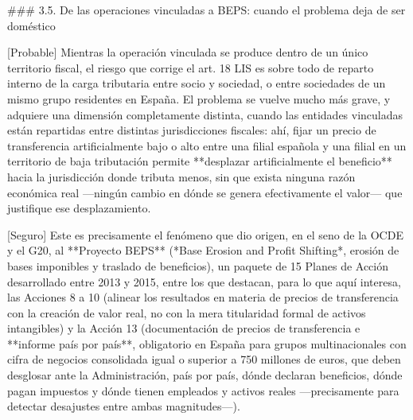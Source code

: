 \documentclass[10pt,a4paper]{article}
\begin{document}
### 3.5. De las operaciones vinculadas a BEPS: cuando el problema deja de ser doméstico

[Probable] Mientras la operación vinculada se produce dentro de un único territorio fiscal, el riesgo que corrige el art. 18 LIS es sobre todo de reparto interno de la carga tributaria entre socio y sociedad, o entre sociedades de un mismo grupo residentes en España. El problema se vuelve mucho más grave, y adquiere una dimensión completamente distinta, cuando las entidades vinculadas están repartidas entre distintas jurisdicciones fiscales: ahí, fijar un precio de transferencia artificialmente bajo o alto entre una filial española y una filial en un territorio de baja tributación permite **desplazar artificialmente el beneficio** hacia la jurisdicción donde tributa menos, sin que exista ninguna razón económica real —ningún cambio en dónde se genera efectivamente el valor— que justifique ese desplazamiento.

[Seguro] Este es precisamente el fenómeno que dio origen, en el seno de la OCDE y el G20, al **Proyecto BEPS** (*Base Erosion and Profit Shifting*, erosión de bases imponibles y traslado de beneficios), un paquete de 15 Planes de Acción desarrollado entre 2013 y 2015, entre los que destacan, para lo que aquí interesa, las Acciones 8 a 10 (alinear los resultados en materia de precios de transferencia con la creación de valor real, no con la mera titularidad formal de activos intangibles) y la Acción 13 (documentación de precios de transferencia e **informe país por país**, obligatorio en España para grupos multinacionales con cifra de negocios consolidada igual o superior a 750 millones de euros, que deben desglosar ante la Administración, país por país, dónde declaran beneficios, dónde pagan impuestos y dónde tienen empleados y activos reales —precisamente para detectar desajustes entre ambas magnitudes—).
\end{document}
